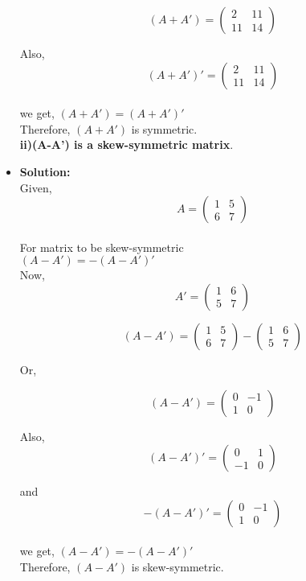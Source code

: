 \documentclass{article}
\begin{document}
\begin{itemize}
 \[
 (A+A')=
 \begin{pmatrix}
 2 & 11\\
 11 & 14 
 \end{pmatrix}
 \] 

Also,\\

 \[
 (A+A')'=
 \begin{pmatrix}
 2 & 11\\
 11 & 14 
 \end{pmatrix}
 \] \\
 we get, $(A+A')=(A+A')'$\\
 
 Therefore, $(A+A')$ is symmetric.\\
 

\textbf{ii)(A-A') is a skew-symmetric matrix}.\\

\item{\textbf{Solution:}}\\
 
 Given,\\
 
 \[
 A=
 \begin{pmatrix}
 1 & 5\\
 6 & 7 
 \end{pmatrix}
 \]\\
 
For matrix to be skew-symmetric\\

$(A-A')=-(A-A')'$\\
 
  Now,\\
 \[
 A'=
 \begin{pmatrix}
 1 & 6\\
 5 & 7 
 \end{pmatrix}
 \]

 
 \[
 (A-A')=
 \begin{pmatrix}
 1 & 5\\
 6 & 7 
 \end{pmatrix}
 -
\begin{pmatrix}
 1 & 6\\
 5 & 7 
 \end{pmatrix}
 \] 
 
 Or,
 
 \[
 (A-A')=
 \begin{pmatrix}
 0 & -1\\
 1 & 0 
 \end{pmatrix}
 \] 

Also,\\

 \[
 (A-A')'=
 \begin{pmatrix}
 0 & 1\\
-1 & 0
 \end{pmatrix}
\]

and\\
\[
 -(A-A')'=
 \begin{pmatrix}
0 & -1\\
1 & 0
 \end{pmatrix}
 \]\\
 
 we get, $(A-A')=-(A-A')'$\\
 
 Therefore, $(A-A')$ is skew-symmetric.\\

\end{itemize}
\end{document}
